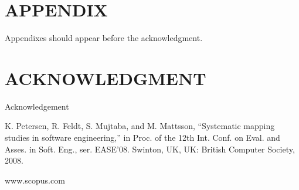 \documentclass[letterpaper, 10 pt, conference]{ieeeconf}  %
\begin{document}






\section*{APPENDIX}

Appendixes should appear before the acknowledgment.

\section*{ACKNOWLEDGMENT}

Acknowledgement


\begin{thebibliography}{99}

 K. Petersen, R. Feldt, S. Mujtaba, and M. Mattsson, “Systematic mapping studies in software engineering,” in Proc. of the 12th Int. Conf. on Eval. and Asses. in Soft. Eng., ser. EASE’08. Swinton, UK, UK: British Computer Society, 2008.

 www.scopus.com









\end{thebibliography}
\end{document}
